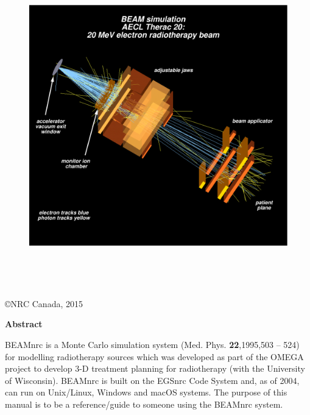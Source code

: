 \documentclass[12pt,twoside]{article}
\begin{document}
\begin{figure}[h]
\begin{center}
\leavevmode
\includegraphics[height=14cm]{figures/th20_20-new}
\end{center}
\end{figure}

\begin{center}

\vfill
\copyright NRC Canada, 2015
\end{center}

\setlength{\baselineskip}{0.5cm}
\newpage

\pagestyle{fancy}
\setcounter{page}{2}


\newpage

\begin{center}
\begin{Large}
{\bf Abstract}
\end{Large}
\end{center}
BEAMnrc is a Monte Carlo simulation system (Med. Phys. {\bf 22},1995,503 --
524) for modelling radiotherapy
sources which was developed as part of the OMEGA project to develop 3-D
treatment planning for radiotherapy
(with the University of Wisconsin).  BEAMnrc is built on the
EGSnrc Code System\cite{KR03} and, as of 2004\cite{Ka03}, can run on Unix/Linux,
Windows and macOS systems.
The purpose of this manual is to be a reference/guide to someone
using the BEAMnrc system.
\end{document}

